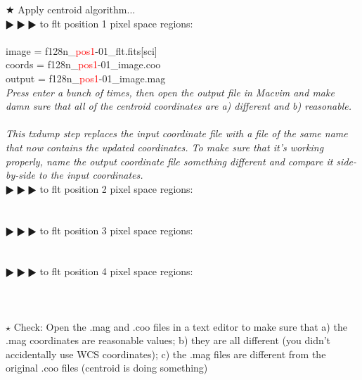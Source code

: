 \documentclass[11pt,obeyspaces]{article} %
\begin{document}
\begin{shaded}
$\bigstar$ Apply centroid algorithm... \\
$\RHD \RHD \RHD$ to flt position 1 pixel space regions: \\
  \\
image = { f128n\_\textcolor{red}{pos1}-01\_flt.fits[sci]} \\ 
coords = {f128n\_\textcolor{red}{pos1}-01\_image.coo} \\
output = {f128n\_\textcolor{red}{pos1}-01\_image.mag} \\
\textit{Press enter a bunch of times, then open the output file in Macvim and make damn sure that all of the centroid coordinates are a) different and b) reasonable.}\\ 
\textcolor{red}{}\textcolor{red}{} \\ 
\textit{This txdump step replaces the input coordinate file with a file of the same name that now contains the updated coordinates. To make sure that it's working properly, name the output coordinate file something different and compare it side-by-side to the input coordinates.} \\
$\RHD \RHD \RHD$ to flt position 2 pixel space regions: \\
  \\ 
\textcolor{red}{}\textcolor{red}{} \\ 
$\RHD \RHD \RHD$ to flt position 3 pixel space regions: \\
  \\
\textcolor{red}{}\textcolor{red}{} \\ 
$\RHD \RHD \RHD$ to flt position 4 pixel space regions: \\
  \\ 
\textcolor{red}{}\textcolor{red}{} \\ \\
$\star$ Check: Open the .mag and .coo files in a text editor to make sure that a) the .mag coordinates are reasonable values; b) they are all different (you didn't accidentally use WCS coordinates); c) the .mag files are different from the original .coo files (centroid is doing something) \\ \\

\end{shaded}
\end{document}
